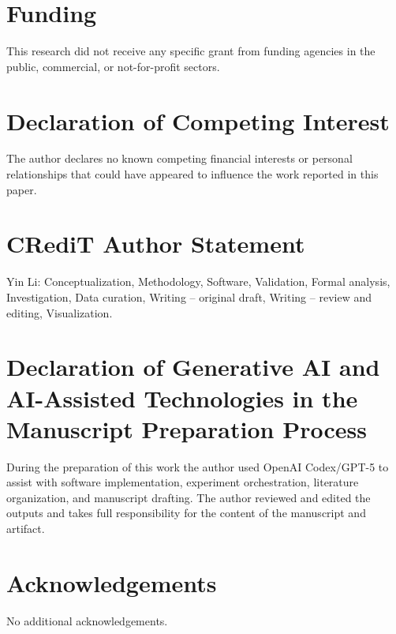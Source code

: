 \documentclass[11pt]{article}
\begin{document}
\section*{Funding}
This research did not receive any specific grant from funding agencies in the
public, commercial, or not-for-profit sectors.

\section*{Declaration of Competing Interest}
The author declares no known competing financial interests or personal
relationships that could have appeared to influence the work reported in this
paper.

\section*{CRediT Author Statement}
Yin Li: Conceptualization, Methodology, Software, Validation, Formal analysis,
Investigation, Data curation, Writing -- original draft, Writing -- review and
editing, Visualization.

\section*{Declaration of Generative AI and AI-Assisted Technologies in the Manuscript Preparation Process}
During the preparation of this work the author used OpenAI Codex/GPT-5 to
assist with software implementation, experiment orchestration, literature
organization, and manuscript drafting. The author reviewed and edited the
outputs and takes full responsibility for the content of the manuscript and
artifact.

\section*{Acknowledgements}
No additional acknowledgements.



\end{document}
